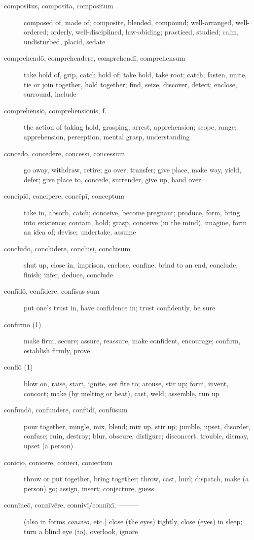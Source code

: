 \begin{description}
    \item[compositus, composita, compositum] composed of, made of; composite, blended, compound; well-arranged, well-ordered; orderly, well-disciplined, law-abiding; practiced, studied; calm, undisturbed, placid, sedate
    \item[comprehendō, comprehendere, comprehendī, comprehensum] take hold of, grip, catch hold of; take hold, take root; catch; fasten, unite, tie or join together, hold together; find, seize, discover, detect; enclose, surround, include
    \item[comprehēnsiō, comprehēnsiōnis, f.] the action of taking hold, grasping; arrest, apprehension; scope, range; apprehension, perception, mental grasp, understanding
    \item[concēdō, concēdere, concessī, concessum] go away, withdraw, retire; go over, transfer; give place, make way, yield, defer; give place to, concede, surrender, give up, hand over
    \item[concipiō, concipere, concēpī, conceptum] take in, absorb, catch; conceive, become pregnant; produce, form, bring into existence; contain, hold; grasp, conceive (in the mind), imagine, form an idea of; devise; undertake, assume
    \item[conclūdō, conclūdere, conclūsī, conclūsum] shut up, close in, imprison, enclose, confine; brind to an end, conclude, finish; infer, deduce, conclude
    \item[confīdō, confīdere, confīsus sum] put one's trust in, have confidence in; trust confidently, be sure
    \item[confirmō (1)] make firm, secure; assure, reassure, make confident, encourage; confirm, establish firmly, prove
    \item[conflō (1)] blow on, raise, start, ignite, set fire to; arouse, stir up; form, invent, concoct; make (by melting or heat), cast, weld; assemble, run up
    \item[confundō, confundere, confūdī, confūsum] pour together, mingle, mix, blend; mix up, stir up; jumble, upset, disorder, confuse; ruin, destroy; blur, obscure, disfigure; disconcert, trouble, dismay, upset (a person)
    \item[coniciō, conicere, coniēcī, coniectum] throw or put together, bring together; throw, cast, hurl; dispatch, make (a person) go; assign, insert; conjecture, guess
    \item[connīueō, connīvēre, connivī/connīxī, ———] (also in forms \textit{cōnīveō}, etc.) close (the eyes) tightly, close (eyes) in sleep; turn a blind eye (to), overlook, ignore

\end{description}
